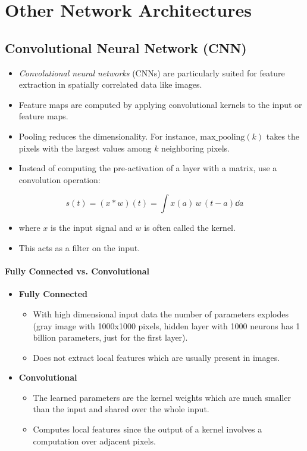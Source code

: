 	\section{Other Network Architectures}

		\subsection{Convolutional Neural Network (CNN)}
			\begin{itemize}
				\item \emph{Convolutional neural networks} (CNNs) are particularly suited for feature extraction in spatially correlated data like images.
				\item Feature maps are computed by applying convolutional kernels to the input or feature maps.
				\item Pooling reduces the dimensionality. For instance, \( \textrm{max\_pooling}(k) \) takes the pixels with the largest values among \(k\) neighboring pixels.
				\item Instead of computing the pre-activation of a layer with a matrix, use a convolution operation:
			\end{itemize}
			\begin{equation}
				s(t) = (x \ast w)(t) = \int x(a) \, w \, (t - a) \dd{a}
			\end{equation}
			\begin{itemize}
				\item[] where \(x\) is the input signal and \(w\) is often called the kernel.
				\item This acts as a filter on the input.
			\end{itemize}
		
			\paragraph{Fully Connected vs. Convolutional}
				\begin{itemize}
					\item \textbf{Fully Connected}
						\begin{itemize}
							\item With high dimensional input data the number of parameters explodes (gray image with 1000x1000 pixels, hidden layer with 1000 neurons has 1 billion parameters, just for the first layer).
							\item Does not extract local features which are usually present in images.
						\end{itemize}
					\item \textbf{Convolutional}
						\begin{itemize}
							\item The learned parameters are the kernel weights which are much smaller than the input and shared over the whole input.
							\item Computes local features since the output of a kernel involves a computation over adjacent pixels.
						\end{itemize}
				\end{itemize}

